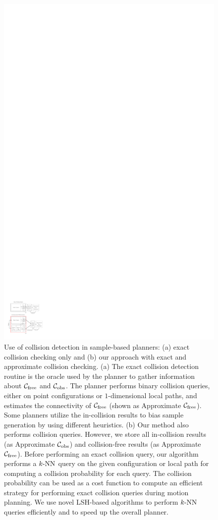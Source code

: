 \begin{figure}[H]
  \centering
  \includegraphics[width=0.7\linewidth]{figs/3/oracle.pdf}
  \caption[Comparison between prior sample-based planners and planners enhanced by instance-based learning]{Use of collision detection in sample-based planners: (a) exact collision checking only and (b) our approach with exact and approximate collision checking. (a) The exact collision detection routine is the oracle used by the planner to gather information about $\mathcal C_{\text{free}}$ and $\mathcal C_{\text{obs}}$. The planner performs binary collision queries, either on point configurations or $1$-dimensional local paths, and estimates the connectivity of $\mathcal C_{\text{free}}$ (shown as Approximate $\mathcal C_{\text{free}}$). Some planners utilize the in-collision results to bias sample generation by using different heuristics. (b) Our method also performs collision queries. However, we store all in-collision results (as Approximate $\mathcal C_{\text{obs}}$) and collision-free results (as Approximate $\mathcal C_{\text{free}}$). Before performing an exact collision query, our algorithm performs a $k\text{-NN}$ query on the given configuration or local path for computing a collision probability for each query. The collision probability can be used as a cost function to compute an efficient strategy for performing exact collision queries during motion planning. We use novel LSH-based algorithms to perform $k\text{-NN}$ queries efficiently and to speed up the overall planner.}
  \label{fig:3:oracle}
\end{figure}


